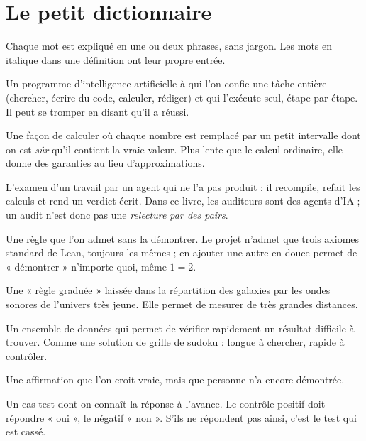 \chapter{Le petit dictionnaire}

Chaque mot est expliqué en une ou deux phrases, sans jargon. Les mots en italique dans une définition ont leur propre
entrée.

\begin{description}[style=nextline,leftmargin=0pt,font=\normalfont\sffamily\bfseries\color{okbleu},itemsep=5pt]
\item[Agent d'IA] Un programme d'intelligence artificielle à qui l'on confie une tâche entière (chercher, écrire du
code, calculer, rédiger) et qui l'exécute seul, étape par étape. Il peut se tromper en disant qu'il a réussi.
\item[Arithmétique de boules (ou d'intervalles)] Une façon de calculer où chaque nombre est remplacé par un petit
intervalle dont on est \emph{sûr} qu'il contient la vraie valeur. Plus lente que le calcul ordinaire, elle donne des
garanties au lieu d'approximations.
\item[Audit] L'examen d'un travail par un agent qui ne l'a pas produit : il recompile, refait les calculs et rend un
verdict écrit. Dans ce livre, les auditeurs sont des agents d'IA ; un audit n'est donc pas une \emph{relecture par des
pairs}.
\item[Axiome] Une règle que l'on admet sans la démontrer. Le projet n'admet que trois axiomes standard de Lean, toujours les mêmes ; en
ajouter une autre en douce permet de « démontrer » n'importe quoi, même $1=2$.
\item[BAO (oscillations acoustiques des baryons)] Une « règle graduée » laissée dans la répartition des galaxies par
les ondes sonores de l'univers très jeune. Elle permet de mesurer de très grandes distances.
\item[Certificat] Un ensemble de données qui permet de vérifier rapidement un résultat difficile à trouver. Comme une
solution de grille de sudoku : longue à chercher, rapide à contrôler.
\item[Conjecture] Une affirmation que l'on croit vraie, mais que personne n'a encore démontrée.
\item[Contrôle (positif, négatif)] Un cas test dont on connaît la réponse à l'avance. Le contrôle positif doit
répondre « oui », le négatif « non ». S'ils ne répondent pas ainsi, c'est le test qui est cassé.

\end{description}
